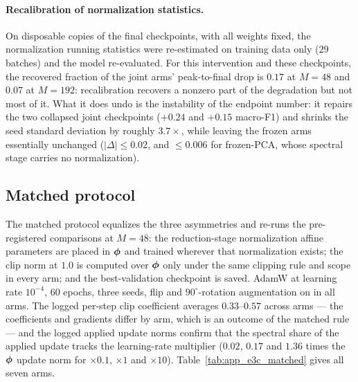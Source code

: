\paragraph{Recalibration of normalization statistics.} On disposable copies of
the final checkpoints, with all weights fixed, the normalization running
statistics were re-estimated on training data only ($29$ batches) and the model
re-evaluated. For this intervention and these checkpoints, the recovered
fraction of the joint arms' peak-to-final drop is $0.17$ at $M = 48$ and
$0.07$ at $M = 192$: recalibration recovers a nonzero part of the degradation
but not most of it. What it does undo is the instability of the endpoint
number: it repairs the two collapsed joint checkpoints ($+0.24$ and $+0.15$
macro-F1) and shrinks the seed standard deviation by roughly $3.7\times$, while
leaving the frozen arms essentially unchanged ($|\Delta| \le 0.02$, and
$\le 0.006$ for frozen-PCA, whose spectral stage carries no normalization).

\subsection{Matched protocol}
\label{app:prod_matched}

The matched protocol equalizes the three asymmetries and re-runs the
pre-registered comparisons at $M = 48$: the reduction-stage normalization
affine parameters are placed in ${\boldsymbol{\phi}}$ and trained wherever that
normalization exists; the clip norm at $1.0$ is computed over ${\boldsymbol{\phi}}$ only
under the same clipping rule and scope in every arm; and the best-validation
checkpoint is saved. AdamW at learning rate $10^{-4}$, $60$ epochs, three
seeds, flip and $90^\circ$-rotation augmentation on in all arms. The logged
per-step clip coefficient averages $0.33$--$0.57$ across arms --- the
coefficients and gradients differ by arm, which is an outcome of the matched
rule --- and the logged applied update norms confirm that the spectral share of
the applied update tracks the learning-rate multiplier ($0.02$, $0.17$ and
$1.36$ times the ${\boldsymbol{\phi}}$ update norm for $\times0.1$, $\times1$ and
$\times10$). Table~\ref{tab:app_e3c_matched} gives all seven arms.

